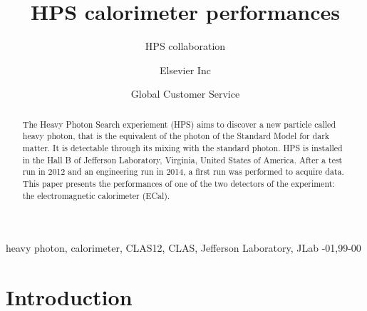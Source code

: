\documentclass[review]{elsarticle}
\begin{document}
\begin{frontmatter}

\title{HPS calorimeter performances}

\author{HPS collaboration}

\author[mymainaddress,mysecondaryaddress]{Elsevier Inc}

\author[mysecondaryaddress]{Global Customer Service}

\address[mymainaddress]{1600 John F Kennedy Boulevard, Philadelphia}
\address[mysecondaryaddress]{360 Park Avenue South, New York}

\begin{abstract}
The Heavy Photon Search experiement (HPS) aims to discover a new particle 
called heavy photon, that is the equivalent of the photon of the Standard 
Model for dark matter. It is detectable through its mixing with the 
standard photon. HPS is installed in the Hall B of Jefferson Laboratory, 
Virginia, United States of America. After a test run in 2012 and an 
engineering run in 2014, a first run was performed to acquire data. This 
paper presents the performances of one of the two detectors of the
experiment: the electromagnetic calorimeter (ECal).
\end{abstract}

\begin{keyword}
heavy photon, calorimeter, CLAS12, CLAS, Jefferson Laboratory, JLab
-01\sep  99-00
\end{keyword}

\end{frontmatter}

\linenumbers

\section{Introduction}
\end{document}
